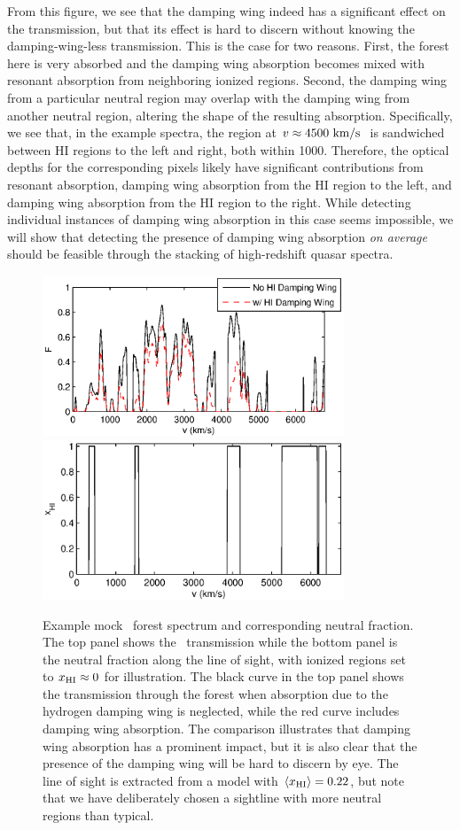 From this figure, we see that the damping wing indeed has a significant effect on the transmission, but that its effect is hard to discern without knowing the damping-wing-less transmission. This is the case for two reasons. First, the forest here is very absorbed and the damping wing absorption becomes mixed with resonant absorption from neighboring ionized regions. Second, the damping wing from a particular neutral region may overlap with the damping wing from another neutral region, altering the shape of the resulting absorption. Specifically, we see that, in the example spectra, the region at $v \approx 4500\ \text{km}/\text{s}\ $ is sandwiched between HI regions to the left and right, both within 1000\kms. Therefore, the optical depths for the corresponding pixels likely have significant contributions from resonant absorption, damping wing absorption from the HI region to the left, and damping wing absorption from the HI region to the right. While detecting individual instances of damping wing absorption in this case 
seems impossible, we will show that detecting the presence of damping wing absorption \textit{on average} should be feasible through the stacking of high-redshift quasar spectra.


\begin{figure}[!ht]
  \centering
  \includegraphics[width=9cm]{fig1a.eps}
  \includegraphics[width=9cm]{fig1b.eps}
  \caption{Example mock \lya\ forest spectrum and corresponding neutral fraction. The top panel shows the \lya\ transmission while the bottom panel is the neutral fraction along the line of sight, with ionized regions set to $x_{\rm HI} \approx 0$ for illustration. The black curve in the top panel shows the transmission through the forest when absorption due to the hydrogen damping wing is neglected, while the red curve includes damping wing  absorption. The comparison illustrates that damping wing absorption has a prominent impact, but it is also clear that the presence of the damping wing will be hard to discern by eye. The line of sight is extracted from a model with $\langle x_{\text{HI}}\rangle = 0.22$, but note that we have deliberately chosen a sightline with more neutral regions than typical.}
  \label{fig:ExampleSpectraA}
\end{figure}




